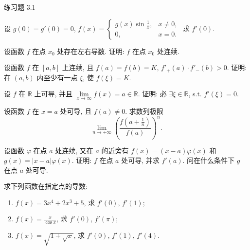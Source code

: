 \begin{exblock}{练习题 3.1}
  \item 设 $g(0) = g'(0) = 0$, $f(x) = \begin{cases}g(x)\sin\frac{1}{x}, & x \neq 0,\\ 0, & x = 0.\end{cases}$ 求 $f'(0)$.

  \item 设函数 $f$ 在点 $x_0$ 处存在左右导数. 证明: $f$ 在点 $x_0$ 处连续.

  \item 设函数 $f$ 在 $[a,b]$ 上连续, 且 $f(a) = f(b) = K$, $f'_+(a)\cdot f'_-(b) > 0$. 证明: 在 $(a,b)$ 内至少有一点 $\xi$, 使 $f(\xi) = K$.

  \item 设 $f$ 在 $\mathbb{R}$ 上可导, 并且 $\lim\limits_{x\to\infty}f(x) = a \in \mathbb{R}$. 证明: 必 $\exists \xi \in \mathbb{R}$, s.t. $f'(\xi) = 0$.

  \item 设函数 $f$ 在 $x = a$ 处可导, 且 $f(a) \neq 0$. 求数列极限
  \[
  \lim_{n\to+\infty}\left(\frac{f\left(a+\frac{1}{n}\right)}{f(a)}\right)^n.
\]

  \item 设函数 $\varphi$ 在点 $a$ 处连续, 又在 $a$ 的近旁有 $f(x) = (x-a)\varphi(x)$ 和 $g(x) = |x-a|\varphi(x)$. 证明: $f$ 在点 $a$ 处可导, 并求 $f'(a)$. 问在什么条件下 $g$ 在点 $a$ 处可导.

  \item 求下列函数在指定点的导数:
  \begin{enumerate}[label=(\arabic*)]
    \item $f(x) = 3x^4 + 2x^3 + 5$, 求 $f'(0)$, $f'(1)$;
    \item $f(x) = \frac{x}{\cos x}$, 求 $f'(0)$, $f'(\pi)$;
    \item $f(x) = \sqrt{1 + \sqrt{x}}$, 求 $f'(0)$, $f'(1)$, $f'(4)$.
  \end{enumerate}


\end{exblock}
